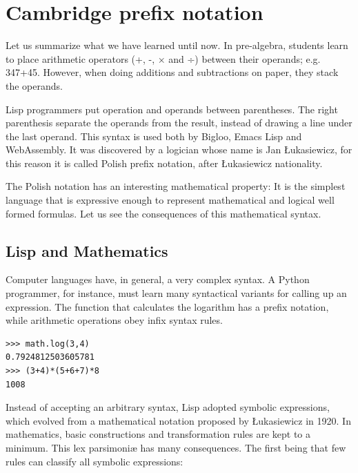 \documentclass[a4paper,12pt]{book}
\begin{document}
\section{Cambridge prefix notation}
Let us summarize what we have learned
until now. In pre-algebra, students
learn to place arithmetic operators (+, -, × and ÷)
between their operands; e.g. 347+45.
However, when doing additions and subtractions
on paper, they stack the operands.



Lisp programmers put operation and operands
between parentheses. The right parenthesis
separate the operands from the result,
instead of drawing a line under the last operand.
This syntax is used both by Bigloo, Emacs
Lisp and WebAssembly. It was discovered by a
logician whose name is Jan Łukasiewicz, for this
reason it is called Polish prefix notation, after
Łukasiewicz nationality.

The Polish notation has an interesting mathematical
property: It is the simplest language that is expressive
enough to represent mathematical and logical well
formed formulas. Let us see the consequences of this
mathematical syntax.

\subsection{Lisp and Mathematics}

Computer languages have, in general, a very complex syntax.
A  Python programmer, for instance, must learn many syntactical
variants for calling up an expression. The function that
calculates the logarithm has a prefix notation, while arithmetic
operations obey infix syntax rules.

\begin{verbatim}
>>> math.log(3,4)
0.7924812503605781
>>> (3+4)*(5+6+7)*8
1008
\end{verbatim}

Instead of accepting an arbitrary syntax, Lisp  adopted
symbolic expressions, which evolved from a mathematical
notation proposed by \L ukasiewicz in 1920. In mathematics,
basic constructions and transformation rules are kept
to a minimum. This {\sc lex parsimoni\ae} has many
consequences. The first being that few rules can classify
all symbolic expressions:
\end{document}

